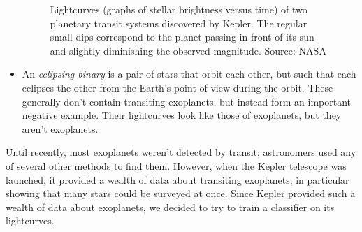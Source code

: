 \documentclass{amsart}
\begin{document}
\begin{itemize}
\begin{figure}
	\caption{Lightcurves (graphs of stellar brightness versus time) of two planetary transit systems discovered by Kepler. The regular small dips correspond to the planet passing in front of its sun and slightly diminishing the observed magnitude. Source: NASA}%
	\end{figure}
	\item An \emph{eclipsing binary} is a pair of stars that orbit each other, but such that each eclipses the other from the Earth's point of view during the orbit. These generally don't contain transiting exoplanets, but instead form an important negative example. Their lightcurves look like those of exoplanets, but they aren't exoplanets.
\end{itemize}

Until recently, most exoplanets weren't detected by transit; astronomers used any of several other methods to find them. However, when the Kepler telescope was launched, it provided a wealth of data about transiting exoplanets, in particular showing that many stars could be surveyed at once. Since Kepler provided such a wealth of data about exoplanets, we decided to try to train a classifier on its lightcurves.%
\end{document}
